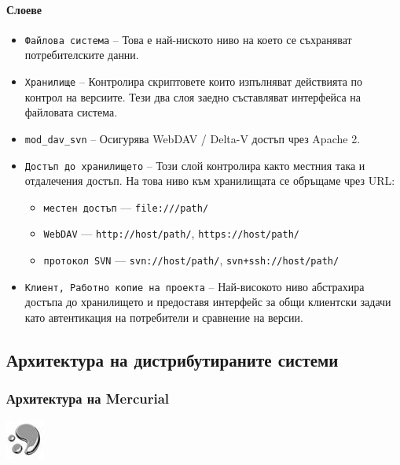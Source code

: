 \documentclass[a4paper]{article}
\def\Hg{Mercurial}
\begin{document}
    \paragraph{Слоеве}

    \begin{itemize}
      \item \texttt{Файлова система} -- Това е най-ниското ниво на което се
      съхраняват потребителските данни.
      \item \texttt{Хранилище} -- Контролира скриптовете които изпълняват действията по
      контрол на версиите. Тези два слоя заедно съставляват интерфейса на
      файловата система.
      \item \texttt{mod\_dav\_svn} -- Осигурява WebDAV / Delta-V достъп чрез Apache 2.
      \item \texttt{Достъп до хранилището} -- Този слой контролира както местния
      така и отдалечения достъп. На това ниво към хранилищата се обръщаме чрез
      URL:
        \begin{itemize}
          \item \texttt{местен достъп} --- \texttt{file:///path/}
          \item \texttt{WebDAV} --- \texttt{http://host/path/}, \quad \texttt{https://host/path/}
          \item \texttt{протокол SVN} --- \texttt{svn://host/path/}, \quad \texttt{svn+ssh://host/path/}
        \end{itemize}
      \item \texttt{Клиент, Работно копие на проекта} -- Най-високото ниво абстрахира
      достъпа до хранилището и предоставя интерфейс за общи клиентски задачи
      като автентикация на потребители и сравнение на версии.
    \end{itemize}

  \subsection{Архитектура на дистрибутираните системи}

    \subsubsection{Архитектура на \Hg \cite{hg-design}}
    \includegraphics[scale=1.0]{hg_icon}
\end{document}
